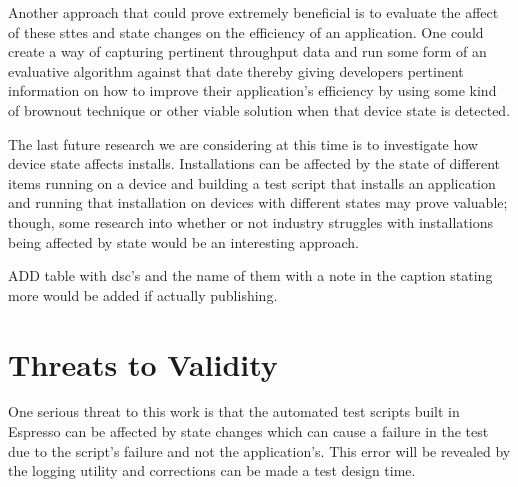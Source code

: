 Another approach that could prove extremely beneficial is to evaluate the affect of these sttes and state changes on the efficiency of an application. One could create a way of capturing pertinent throughput data and run some form of an evaluative algorithm against that date thereby giving developers pertinent information on how to improve their application's efficiency by using some kind of brownout technique \cite{Klein:2014:BBM:2568225.2568227} or other viable solution when that device state is detected. 

The last future research we are considering at this time is to investigate how device state affects installs.  Installations can be affected by the state of different items running on a device and building a test script that installs an application and running that installation on devices with different states may prove valuable; though, some research into whether or not industry struggles with installations being affected by state would be an interesting approach.  

ADD table with dsc's and the name of them with a note in the caption stating more would be added if actually publishing.  


\section{Threats to Validity}
One serious threat to this work is that the automated test scripts built in Espresso can be affected by state changes \cite{7927971} which can cause a failure in the test due to the script's failure and not the application's.  This error will be revealed by the logging utility and corrections can be made a test design time.  

